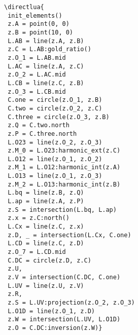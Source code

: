 \begin{minipage}{.42\textwidth}
\begin{verbatim}
\directlua{
 init_elements()
 z.A = point(0, 0)
 z.B = point(10, 0)
 L.AB = line(z.A, z.B)
 z.C = L.AB:gold_ratio()
 z.O_1 = L.AB.mid
 L.AC = line(z.A, z.C)
 z.O_2 = L.AC.mid
 L.CB = line(z.C, z.B)
 z.O_3 = L.CB.mid
 C.one = circle(z.O_1, z.B)
 C.two = circle(z.O_2, z.C)
 C.three = circle(z.O_3, z.B)
 z.Q = C.two.north
 z.P = C.three.north
 L.O23 = line(z.O_2, z.O_3)
 z.M_0 = L.O23:harmonic_ext(z.C)
 L.O12 = line(z.O_1, z.O_2)
 z.M_1 = L.O12:harmonic_int(z.A)
 L.O13 = line(z.O_1, z.O_3)
 z.M_2 = L.O13:harmonic_int(z.B)
 L.bq = line(z.B, z.Q)
 L.ap = line(z.A, z.P)
 z.S = intersection(L.bq, L.ap)
 z.x = z.C:north()
 L.Cx = line(z.C, z.x)
 z.D, _ = intersection(L.Cx, C.one)
 L.CD = line(z.C, z.D)
 z.O_7 = L.CD.mid
 C.DC = circle(z.D, z.C)
 z.U,
 z.V = intersection(C.DC, C.one)
 L.UV = line(z.U, z.V)
 z.R,
 z.S = L.UV:projection(z.O_2, z.O_3)
 L.O1D = line(z.O_1, z.D)
 z.W = intersection(L.UV, L.O1D)
 z.O = C.DC:inversion(z.W)}
\end{verbatim}
\end{minipage}
\begin{minipage}{.58\textwidth}
\begin{center}
\end{center}
\end{minipage}


